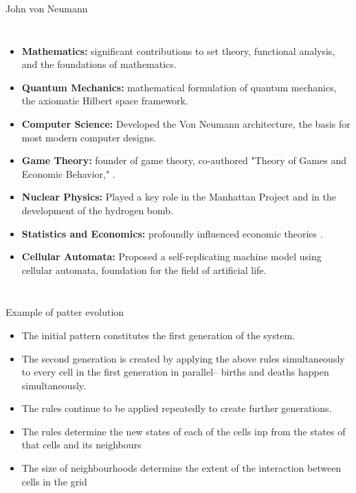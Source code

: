 \begin{frame}{John von Neumann}
\begin{columns}
            \begin{itemize}
                \item \textbf{Mathematics:} significant contributions to set theory, functional analysis, and the foundations of mathematics.
                \item \textbf{Quantum Mechanics:}  mathematical formulation of quantum mechanics, the axiomatic Hilbert space framework.
                \item \textbf{Computer Science:} Developed the Von Neumann architecture, the basis for most modern computer designs.
                \item \textbf{Game Theory:} founder of game theory, co-authored "Theory of Games and Economic Behavior," .
                \item \textbf{Nuclear Physics:} Played a key role in the Manhattan Project and  in the development of the hydrogen bomb.
                \item \textbf{Statistics and Economics:} profoundly influenced economic theories .
                \item \textbf{Cellular Automata:} Proposed a self-replicating machine model using cellular automata,  foundation for the field of artificial life.
            \end{itemize}

        
    \end{columns}
\end{frame}

\begin{frame}{Example of patter evolution}
    \begin{itemize}
        \item The initial pattern constitutes the first generation of the system. 
        \item The second generation is created by applying the above rules simultaneously to every cell in the first generation in parallel-- births and deaths happen simultaneously. 
        \item The rules continue to be applied repeatedly to create further generations.
        \item The rules determine the new states of each of the cells inp from the states of that cells and its neighbours
        \item The size of neighbourhoods determine the extent of the interaction between cells in the grid
    \end{itemize}
\end{frame}

